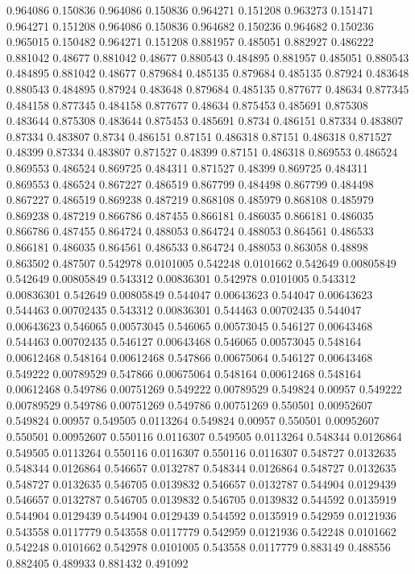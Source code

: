 0.964086 0.150836
0.964086 0.150836
0.964271 0.151208
0.963273 0.151471
0.964271 0.151208
0.964086 0.150836
0.964682 0.150236
0.964682 0.150236
0.965015 0.150482
0.964271 0.151208
0.881957 0.485051
0.882927 0.486222
0.881042 0.48677
0.881042 0.48677
0.880543 0.484895
0.881957 0.485051
0.880543 0.484895
0.881042 0.48677
0.879684 0.485135
0.879684 0.485135
0.87924 0.483648
0.880543 0.484895
0.87924 0.483648
0.879684 0.485135
0.877677 0.48634
0.877345 0.484158
0.877345 0.484158
0.877677 0.48634
0.875453 0.485691
0.875308 0.483644
0.875308 0.483644
0.875453 0.485691
0.8734 0.486151
0.87334 0.483807
0.87334 0.483807
0.8734 0.486151
0.87151 0.486318
0.87151 0.486318
0.871527 0.48399
0.87334 0.483807
0.871527 0.48399
0.87151 0.486318
0.869553 0.486524
0.869553 0.486524
0.869725 0.484311
0.871527 0.48399
0.869725 0.484311
0.869553 0.486524
0.867227 0.486519
0.867799 0.484498
0.867799 0.484498
0.867227 0.486519
0.869238 0.487219
0.868108 0.485979
0.868108 0.485979
0.869238 0.487219
0.866786 0.487455
0.866181 0.486035
0.866181 0.486035
0.866786 0.487455
0.864724 0.488053
0.864724 0.488053
0.864561 0.486533
0.866181 0.486035
0.864561 0.486533
0.864724 0.488053
0.863058 0.48898
0.863502 0.487507
0.542978 0.0101005
0.542248 0.0101662
0.542649 0.00805849
0.542649 0.00805849
0.543312 0.00836301
0.542978 0.0101005
0.543312 0.00836301
0.542649 0.00805849
0.544047 0.00643623
0.544047 0.00643623
0.544463 0.00702435
0.543312 0.00836301
0.544463 0.00702435
0.544047 0.00643623
0.546065 0.00573045
0.546065 0.00573045
0.546127 0.00643468
0.544463 0.00702435
0.546127 0.00643468
0.546065 0.00573045
0.548164 0.00612468
0.548164 0.00612468
0.547866 0.00675064
0.546127 0.00643468
0.549222 0.00789529
0.547866 0.00675064
0.548164 0.00612468
0.548164 0.00612468
0.549786 0.00751269
0.549222 0.00789529
0.549824 0.00957
0.549222 0.00789529
0.549786 0.00751269
0.549786 0.00751269
0.550501 0.00952607
0.549824 0.00957
0.549505 0.0113264
0.549824 0.00957
0.550501 0.00952607
0.550501 0.00952607
0.550116 0.0116307
0.549505 0.0113264
0.548344 0.0126864
0.549505 0.0113264
0.550116 0.0116307
0.550116 0.0116307
0.548727 0.0132635
0.548344 0.0126864
0.546657 0.0132787
0.548344 0.0126864
0.548727 0.0132635
0.548727 0.0132635
0.546705 0.0139832
0.546657 0.0132787
0.544904 0.0129439
0.546657 0.0132787
0.546705 0.0139832
0.546705 0.0139832
0.544592 0.0135919
0.544904 0.0129439
0.544904 0.0129439
0.544592 0.0135919
0.542959 0.0121936
0.543558 0.0117779
0.543558 0.0117779
0.542959 0.0121936
0.542248 0.0101662
0.542248 0.0101662
0.542978 0.0101005
0.543558 0.0117779
0.883149 0.488556
0.882405 0.489933
0.881432 0.491092
